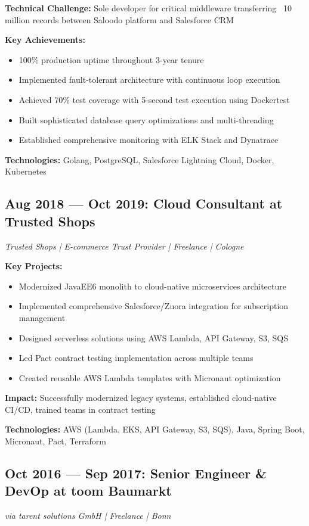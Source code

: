 \documentclass[10pt,a4paper]{article}
\newenvironment{compactlist}{\begin{itemize}[leftmargin=1em,itemsep=0pt,parsep=0pt,topsep=0pt,partopsep=0pt]}{\end{itemize}}
\begin{document}
\textbf{Technical Challenge:} Sole developer for critical middleware transferring ~10 million records between Saloodo platform and Salesforce CRM

\textbf{Key Achievements:}
\begin{compactlist}
\item 100\% production uptime throughout 3-year tenure
\item Implemented fault-tolerant architecture with continuous loop execution
\item Achieved 70\% test coverage with 5-second test execution using Dockertest
\item Built sophisticated database query optimizations and multi-threading
\item Established comprehensive monitoring with ELK Stack and Dynatrace
\end{compactlist}

\textbf{Technologies:} Golang, PostgreSQL, Salesforce Lightning Cloud, Docker, Kubernetes

\subsection{Aug 2018 — Oct 2019: Cloud Consultant at Trusted Shops}
\textit{Trusted Shops | E-commerce Trust Provider | Freelance | Cologne}

\textbf{Key Projects:}
\begin{compactlist}
\item Modernized JavaEE6 monolith to cloud-native microservices architecture
\item Implemented comprehensive Salesforce/Zuora integration for subscription management
\item Designed serverless solutions using AWS Lambda, API Gateway, S3, SQS
\item Led Pact contract testing implementation across multiple teams
\item Created reusable AWS Lambda templates with Micronaut optimization
\end{compactlist}

\textbf{Impact:} Successfully modernized legacy systems, established cloud-native CI/CD, trained teams in contract testing

\textbf{Technologies:} AWS (Lambda, EKS, API Gateway, S3, SQS), Java, Spring Boot, Micronaut, Pact, Terraform

\newpage

\subsection{Oct 2016 — Sep 2017: Senior Engineer \& DevOp at toom Baumarkt}
\textit{via tarent solutions GmbH | Freelance | Bonn}
\end{document}

